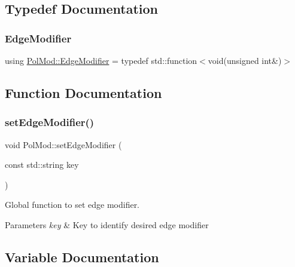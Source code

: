 \subsection{Typedef Documentation}
\mbox{\label{namespace_pol_mod_a85db6c8495e67b2d486ea7dcf7f6aad4}} 
\subsubsection{\texorpdfstring{Edge\+Modifier}{EdgeModifier}}
{\footnotesize\ttfamily using \hyperlink{namespace_pol_mod_a85db6c8495e67b2d486ea7dcf7f6aad4}{Pol\+Mod\+::\+Edge\+Modifier} = typedef std\+::function$<$void(unsigned int\&)$>$}



\subsection{Function Documentation}
\mbox{\label{namespace_pol_mod_afc8b6cf3366cdb9a14e5ae6d2f2e8326}} 
\subsubsection{\texorpdfstring{set\+Edge\+Modifier()}{setEdgeModifier()}}
{\footnotesize\ttfamily void Pol\+Mod\+::set\+Edge\+Modifier (\begin{DoxyParamCaption}\item[{const std\+::string}]{key }\end{DoxyParamCaption})}



Global function to set edge modifier. 


\begin{DoxyParams}{Parameters}
{\em key} & Key to identify desired edge modifier \\
\hline
\end{DoxyParams}


\subsection{Variable Documentation}
\mbox{\label{namespace_pol_mod_ae33c3fdc58614d743b65a5db0859b6a7}} 
